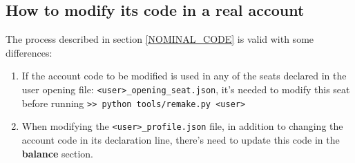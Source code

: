 \documentclass[12pt, a4paper]{article}
\begin{document}
 \subsection{How to modify its code in a real account}  
 The process described in section \ref{NOMINAL_CODE} is valid with some differences:
 \begin{enumerate}
 \item If the account code to be modified is used in any of the seats declared in the user opening file: \verb!<user>_opening_seat.json!, it's needed to modify this seat  before running \verb!>> python tools/remake.py <user>!
 \item When modifying the \verb!<user>_profile.json! file,  in addition to changing the account code in its declaration line, there's need to update this code in the \textbf{balance} section.
 \end{enumerate}
\end{document}
